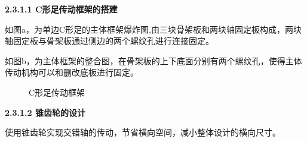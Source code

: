 \documentclass[12pt]{article}
\begin{document}
\begin{CJK}{UTF8}{song}
\textbf{2.3.1.1 C形足传动框架的搭建}\par
 如图a，为单边C形足的主体框架爆炸图,由三块骨架板和两块轴固定板构成，两块轴固定板与骨架板通过侧边的两个螺纹孔进行连接固定。\par
如图b，为主体框架的整合图，在骨架板的上下底面分别有两个螺纹孔，使得主体传动机构可以和删改底板进行固定。
\begin{figure}[H]
{}
\quad
{}
\quad
\caption{C形足传动框架}
\end{figure}
\textbf{2.3.1.2 锥齿轮的设计}\par
 使用锥齿轮实现交错轴的传动，节省横向空间，减小整体设计的横向尺寸。
 \begin{figure}[H]
{}
\quad

\end{figure}
\end{CJK}
\end{document}
